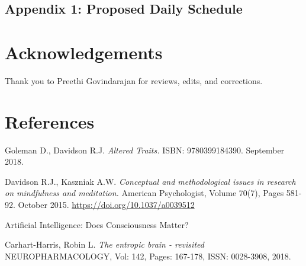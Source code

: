 \documentclass[a4paper, amsfonts, amssymb, amsmath, reprint, showkeys, nofootinbib, twoside]{revtex4-1}
\begin{document}
\subsection{Appendix 1: Proposed Daily Schedule}

\section*{Acknowledgements}

Thank you to Preethi Govindarajan for reviews, edits, and corrections.


\section*{References}

\begin{thebibliography}{99}

  Goleman D., Davidson R.J.
  \textit{Altered Traits.}
  ISBN: 9780399184390. September 2018.

  Davidson R.J., Kaszniak A.W.
  \textit{Conceptual and methodological issues in research on mindfulness and meditation.}
  American Psychologist, Volume 70(7), Pages 581-92. October 2015.
  \url{https://doi.org/10.1037/a0039512}

  Artificial Intelligence: Does Consciousness Matter?

  Carhart-Harris, Robin L.
  \textit{The entropic brain - revisited}
  NEUROPHARMACOLOGY, Vol: 142, Pages: 167-178, ISSN: 0028-3908, 2018.


\end{thebibliography}

% 
\end{document}
